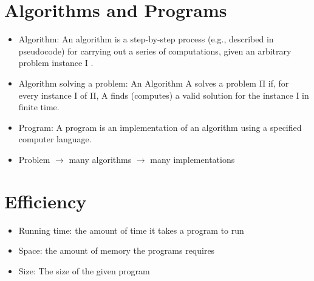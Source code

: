 \documentclass[12pt]{article}
\begin{document}
\section*{Algorithms and Programs}
\begin{itemize}
\item Algorithm: An algorithm is a step-by-step process (e.g., described in pseudocode) for carrying out a series of computations, given an arbitrary problem instance I .
\item Algorithm solving a problem: An Algorithm A solves a problem Π if, for every instance I of Π, A finds (computes) a valid solution for the instance I in finite time.
\item Program: A program is an implementation of an algorithm using a specified computer language.
\item Problem $\rightarrow$ many algorithms $\rightarrow$ many implementations
\end{itemize}

\section*{Efficiency}
\begin{itemize}
\item Running time: the amount of time it takes a program to run
\item Space: the amount of memory the programs requires
\item Size: The size of the given program
\end{itemize}
\end{document}
